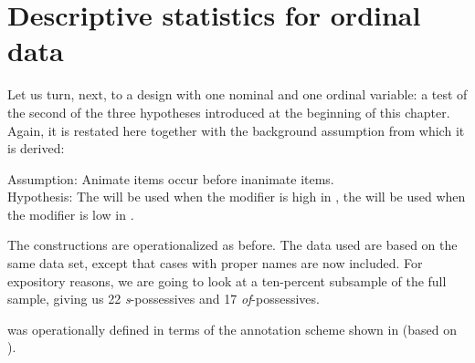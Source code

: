 
\section{Descriptive statistics for ordinal data}
\label{sec:descriptiveordinal}

Let us turn, next, to a design  with one nominal  and one ordinal  variable: a test of the second of the three hypotheses  introduced at the beginning of this chapter. Again, it is restated here together with the background assumption from which it is derived:

\begin{exe}
\ex Assumption: Animate  items occur before inanimate items. \\[1.5ex]
Hypothesis:  The  will be used when the modifier is high in , the   will be used when the modifier is low in .
\label{ex:animacyhypothesis}
\end{exe}

The constructions are operationalized  as before. The data used are based on the same data set, except that cases with proper names are now included. For expository reasons, we are going to look at a ten\hyp{}percent subsample of the full sample, giving us 22 \textit{s}-possessives  and 17 \textit{of}-possessives.

  was operationally defined in terms of the annotation  scheme shown in  (based on \citealt{zaenen_animacy_2004}).

